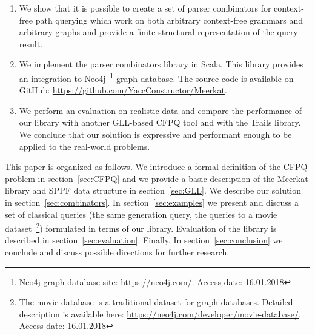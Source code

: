 \begin{enumerate}
\item We show that it is possible to create a set of parser combinators for context-free path querying which work on both arbitrary context-free grammars and arbitrary graphs and provide a finite structural representation of the query result.
\item We implement the parser combinators library in Scala. This library provides an integration to Neo4j~\footnote{Neo4j graph database site: \url{https://neo4j.com/}. Access date: 16.01.2018} graph database. The source code is available on GitHub: \url{https://github.com/YaccConstructor/Meerkat}.
\item We perform an evaluation on realistic data and compare the performance of our library with another GLL-based CFPQ tool and with the Trails library.
We conclude that our solution is expressive and performant enough to be applied to the real-world problems.
\end{enumerate}


This paper is organized as follows.
We introduce a formal definition of the CFPQ problem in section~\ref{sec:CFPQ} and we provide a basic description of the Meerkat library and SPPF data structure in section~\ref{sec:GLL}.
We describe our solution in section~\ref{sec:combinators}.
In section~\ref{sec:examples} we present and discuss a set of classical queries (the same generation query, the queries to a movie dataset~\footnote{The movie database is a traditional dataset for graph databases. Detailed description is available here: \url{https://neo4j.com/developer/movie-database/}. Access date: 16.01.2018}) 
formulated in terms of our library.
Evaluation of the library is described in section~\ref{sec:evaluation}.
Finally, In section~\ref{sec:conclusion} we conclude and discuss possible directions for further research. 
